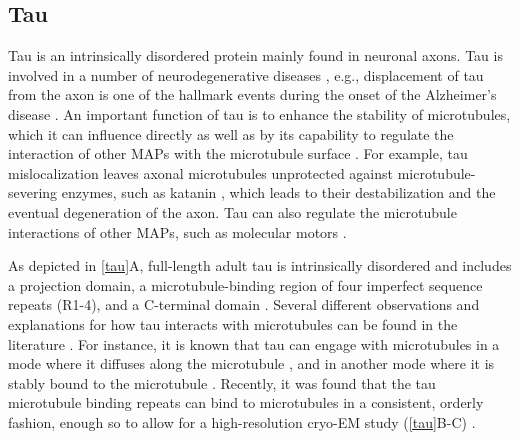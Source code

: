 \subsection{Tau}
Tau is an intrinsically disordered protein mainly found in neuronal axons. Tau is involved in a number of neurodegenerative diseases \parencite{Gao2018,Morris2011b,iqbal2016tau}, e.g., displacement of tau from the axon is one of the hallmark events during the onset of the Alzheimer’s disease \parencite{zempel2015tau}. An important function of tau is to enhance the stability of microtubules, which it can influence directly \cite{Drechsel1992} as well as by its capability to regulate the interaction of other MAPs with the microtubule surface \parencite{Morris2011b}. For example, tau mislocalization leaves axonal microtubules unprotected against microtubule-severing enzymes, such as katanin \parencite{Qiang2006}, which leads to their destabilization and the eventual degeneration of the axon. Tau can also regulate the microtubule interactions of other MAPs, such as molecular motors \parencite{Chaudhary2018,Dixit2008,ebneth1998overexpression,seitz2002single,trinczek1999tau,vershinin2007multiple}. \par
As depicted in \autoref{tau}A, full-length adult tau is intrinsically disordered and includes a projection domain, a microtubule-binding region of four imperfect sequence repeats (R1-4), and a C-terminal domain \parencite{Himmler1381}. Several different observations and explanations for how tau interacts with microtubules can be found in the literature \parencite{Morris2011b,Mcvicker2014,Kellogg2018}. For instance, it is known that tau can engage with microtubules in a mode where it diffuses along the microtubule \parencite{Hinrichs2012b}, and in another mode where it is stably bound to the microtubule \parencite{Mcvicker2014}. Recently, it was found that the tau microtubule binding repeats can bind to microtubules in a consistent, orderly fashion, enough so to allow for a high-resolution cryo-EM study (\autoref{tau}B-C) \parencite{Kellogg2018}. 
